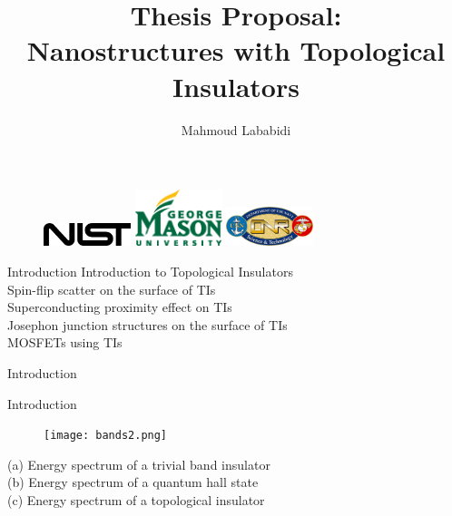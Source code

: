 \documentclass[]{beamer}
\title{Thesis Proposal: \\Nanostructures with Topological Insulators}
\author{Mahmoud Lababidi}
\begin{document}
\begin{frame}{}
\maketitle
\begin{figure}
\includegraphics[width=1in]{include/nist.png}\quad
\includegraphics[width=1in]{include/gmu.eps}\quad
\includegraphics[width=1in]{include/onr.jpg}
\end{figure}
\end{frame}

\begin{frame}{Introduction}
Introduction to Topological Insulators\\
Spin-flip scatter on the surface of TIs\\
Superconducting proximity effect on TIs\\
Josephon junction structures on the surface of TIs\\
MOSFETs using TIs\\

\end{frame}

\begin{frame}{Introduction}
\maketitle
\end{frame}



\begin{frame}{Introduction}
\begin{figure}
\center
\texttt{[image: bands2.png]}

\end{figure}

(a) Energy spectrum of a trivial band insulator \\
(b)  Energy spectrum of a quantum hall state \\
(c)  Energy spectrum of a topological insulator \\

\end{frame}
\end{document}

